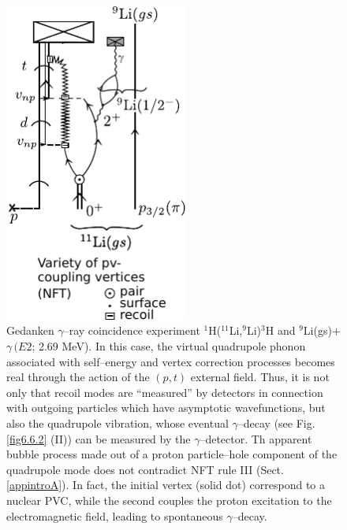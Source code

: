           \begin{figure}
          \centerline {
          \includegraphics*[width=6cm]{introduccion/figs/figintro6xxx}
          }
          \caption{Gedanken $\gamma$--ray coincidence experiment $^1$H($^{11}$Li,$^9$Li)$^3$H and $^9$Li(gs)+$\gamma\, (E2$; 2.69 MeV). In  this case, the virtual quadrupole phonon associated with self--energy and vertex correction processes becomes real through the action of the $(p,t)$ external field. Thus, it is not only that recoil modes are ``measured'' by  detectors in connection with outgoing particles which have  asymptotic wavefunctions, but also the quadrupole vibration, whose eventual $\gamma$--decay (see Fig. \ref{fig6.6.2} (II)) can be  measured by the $\gamma$--detector. Th apparent bubble process made out of a proton particle--hole component of the quadrupole mode does not contradict NFT rule III (Sect. \ref{appintroA}). In fact, the initial vertex (solid dot) correspond to a nuclear PVC, while the second couples the proton excitation to the electromagnetic field, leading to spontaneous $\gamma$--decay.}
          \label{figintro6x}
          \end{figure}
